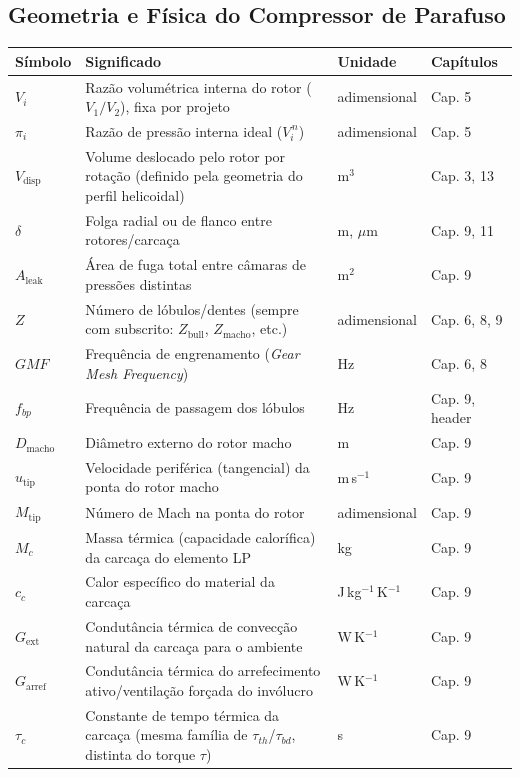 \documentclass[12pt,a4paper]{article}
\numberwithin{equation}{section}
\numberwithin{table}{section}
\numberwithin{figure}{section}
\begin{document}
{\subsection*{Geometria e Física do Compressor de Parafuso}
\begin{longtable}{>{\raggedright\arraybackslash}p{2.8cm} >{\raggedright\arraybackslash}p{5.3cm} >{\raggedright\arraybackslash}p{2.1cm} >{\raggedright\arraybackslash}p{4.2cm}}
	\toprule
	\textbf{Símbolo} & \textbf{Significado} & \textbf{Unidade} & \textbf{Capítulos} \\ \midrule
	\endhead
	$V_i$ & Razão volumétrica interna do rotor ($V_1/V_2$), fixa por projeto & adimensional & Cap. 5 \\
	$\pi_i$ & Razão de pressão interna ideal ($V_i^{\,n}$) & adimensional & Cap. 5 \\
	$V_{\text{disp}}$ & Volume deslocado pelo rotor por rotação (definido pela geometria do perfil helicoidal) & m$^3$ & Cap. 3, 13 \\
	$\delta$ & Folga radial ou de flanco entre rotores/carcaça & m, $\mu$m & Cap. 9, 11 \\
	$A_{\text{leak}}$ & Área de fuga total entre câmaras de pressões distintas & m$^2$ & Cap. 9 \\
	$Z$ & Número de lóbulos/dentes (sempre com subscrito: $Z_{\text{bull}}$, $Z_{\text{macho}}$, etc.) & adimensional & Cap. 6, 8, 9 \\
	$GMF$ & Frequência de engrenamento (\textit{Gear Mesh Frequency}) & Hz & Cap. 6, 8 \\
	$f_{bp}$ & Frequência de passagem dos lóbulos & Hz & Cap. 9, header \\
	$D_{\text{macho}}$ & Diâmetro externo do rotor macho & m & Cap. 9 \\
	$u_{\text{tip}}$ & Velocidade periférica (tangencial) da ponta do rotor macho & m\,s$^{-1}$ & Cap. 9 \\
	$M_{\text{tip}}$ & Número de Mach na ponta do rotor & adimensional & Cap. 9 \\
	$M_c$ & Massa térmica (capacidade calorífica) da carcaça do elemento LP & kg & Cap. 9 \\
	$c_c$ & Calor específico do material da carcaça & J\,kg$^{-1}$\,K$^{-1}$ & Cap. 9 \\
	$G_{\text{ext}}$\dag & Condutância térmica de convecção natural da carcaça para o ambiente & W\,K$^{-1}$ & Cap. 9 \\
	$G_{\text{arref}}$\dag & Condutância térmica do arrefecimento ativo/ventilação forçada do invólucro & W\,K$^{-1}$ & Cap. 9 \\
	$\tau_c$\dag & Constante de tempo térmica da carcaça (mesma família de $\tau_{th}$/$\tau_{bd}$, distinta do torque $\tau$) & s & Cap. 9 \\ \bottomrule
\end{longtable}

}
\end{document}
